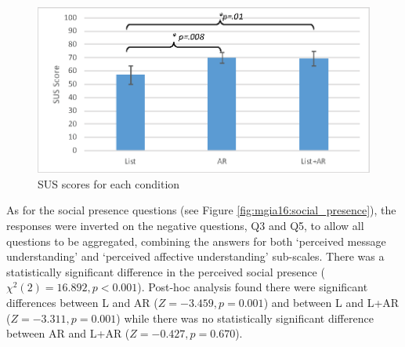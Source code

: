 \begin{figure}[htb]
  \centering
  \includegraphics[width=0.8\linewidth]{images/61-video-mgia16/sus2.eps}
  \caption{SUS scores for each condition}
  \label{fig:mgia16:questions_sus}
\end{figure}

As for the social presence questions (see Figure \ref{fig:mgia16:social_presence}), the responses were inverted on the negative questions, Q3 and Q5, to allow all questions to be aggregated, combining the answers for both `perceived message understanding' and `perceived affective understanding' sub-scales. There was a statistically significant difference in the perceived social presence ($\chi^2(2)=16.892, p<0.001$). Post-hoc analysis found there were significant differences between L and AR ($Z=-3.459, p=0.001$) and between L and L+AR ($Z=-3.311, p=0.001$) while there was no statistically significant difference between AR and L+AR ($Z=-0.427, p=0.670$). 




